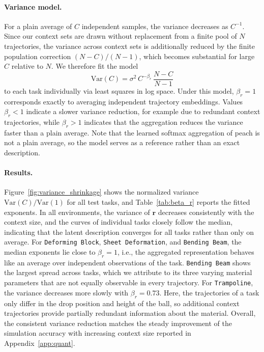 \paragraph{Variance model.}
For a plain average of $C$ independent samples, the variance decreases as $C^{-1}$. Since our context sets are drawn without replacement from a finite pool of $N$ trajectories, the variance across context sets is additionally reduced by the finite population correction $(N-C)/(N-1)$, which becomes substantial for large $C$ relative to $N$. We therefore fit the model
\begin{equation*}
    \mathrm{Var}(C) = \sigma^2 \, C^{-\beta_r} \, \frac{N - C}{N - 1}
\end{equation*}
to each task individually via least squares in log space. Under this model, $\beta_r = 1$ corresponds exactly to averaging independent trajectory embeddings. Values $\beta_r < 1$ indicate a slower variance reduction, for example due to redundant context trajectories, while $\beta_r > 1$ indicates that the aggregation reduces the variance faster than a plain average. Note that the learned softmax aggregation of \gls{peach} is not a plain average, so the model serves as a reference rather than an exact description.

\paragraph{Results.}
Figure~\ref{fig:variance_shrinkage} shows the normalized variance $\mathrm{Var}(C)/\mathrm{Var}(1)$ for all test tasks, and Table~\ref{tab:beta_r} reports the fitted exponents. In all environments, the variance of $\mathbf{r}$ decreases consistently with the context size, and the curves of individual tasks closely follow the median, indicating that the latent description converges for all tasks rather than only on average. For \texttt{Deforming Block}, \texttt{Sheet Deformation}, and \texttt{Bending Beam}, the median exponents lie close to $\beta_r=1$, i.e., the aggregated representation behaves like an average over independent observations of the task. \texttt{Bending Beam} shows the largest spread across tasks, which we attribute to its three varying material parameters that are not equally observable in every trajectory. For \texttt{Trampoline}, the variance decreases more slowly with $\beta_r = 0.73$. Here, the trajectories of a task only differ in the drop position and height of the ball, so additional context trajectories provide partially redundant information about the material. Overall, the consistent variance reduction matches the steady improvement of the simulation accuracy with increasing context size reported in Appendix~\ref{app:quant}.

